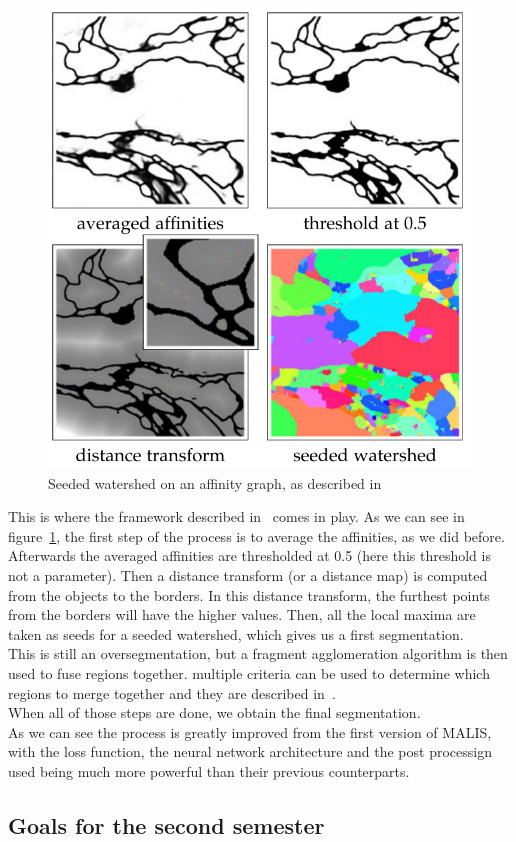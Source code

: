 \begin{figure}[!htbp]
	\centering
	\includegraphics[width=0.5\linewidth]{./images/mala_post_proc.png}
	\caption{Seeded watershed on an affinity graph, as described in~\cite{funke_large_2019}}%
	\label{fig:seeded_ws}
\end{figure}

This is where the framework described in~\cite{funke_large_2019} comes in play.
As we can see in figure~\ref{fig:seeded_ws}, the first step of the process is
to average the affinities, as we did before. Afterwards the averaged affinities
are thresholded at 0.5 (here this threshold is not a parameter). Then a
distance transform (or a distance map) is computed from the objects to the
borders. In this distance transform, the furthest points from the borders will
have the higher values. Then, all the local maxima are taken as seeds for a
seeded watershed, which gives us a first segmentation.\\

This is still an oversegmentation, but a fragment agglomeration algorithm is
then used to fuse regions together. multiple criteria can be used to
determine which regions to merge together and they are described
in~\cite{funke_large_2019}.\\
When all of those steps are done, we obtain the final segmentation.\\

As we can see the process is greatly improved from the first version of MALIS,
with the loss function, the neural network architecture and the post processign
used being much more powerful than their previous counterparts.

\subsection{Goals for the second semester}

